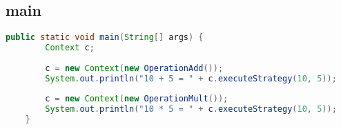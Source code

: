 \subsection{main}
\begin{lstlisting}[language=java]
    public static void main(String[] args) {
        Context c;
        
        c = new Context(new OperationAdd());
        System.out.println("10 + 5 = " + c.executeStrategy(10, 5));
    
        c = new Context(new OperationMult());
        System.out.println("10 * 5 = " + c.executeStrategy(10, 5));
    }
\end{lstlisting}